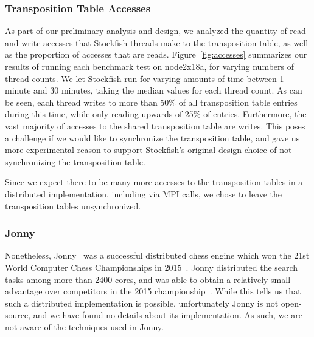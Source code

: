 \documentclass{article}
\begin{document}
\subsubsection{Transposition Table Accesses}
As part of our preliminary analysis and design, we analyzed the quantity of
read and write accesses that Stockfish threads make to the transposition table, as well as
the proportion of accesses that are reads. Figure~\ref{fig:accesses} summarizes
our results of running each benchmark test on node2x18a, for varying numbers of
thread counts. We let Stockfish run for varying amounts of time between 1
minute and 30 minutes, taking the median values for each thread count. As can be
seen, each thread writes to more than 50\% of all transposition table entries during
this time, while only reading upwards of 25\% of entries. Furthermore, the vast
majority of accesses to the shared transposition table are writes. This poses a
challenge if we would like to synchronize the transposition table, and gave us
more experimental reason to support Stockfish's original design choice of not
synchronizing the transposition table.

Since we expect there to be many more accesses to the transposition tables in a
distributed implementation, including via MPI calls, we chose to leave the
transposition tables unsynchronized.

\subsubsection{Jonny}
Nonetheless, Jonny~\cite{wiki:Jonny} was a successful distributed chess engine
which won the 21st World Computer Chess Championships in 2015~\cite{WCCC15}.
Jonny distributed the search tasks among more than 2400 cores, and was able to
obtain a relatively small advantage over competitors in the 2015
championship~\cite{WCCC15}.
While this tells us that such a distributed implementation is possible,
unfortunately Jonny is not open-source, and we have found no details about its
implementation. As such, we are not aware of the techniques used in Jonny.
\end{document}
